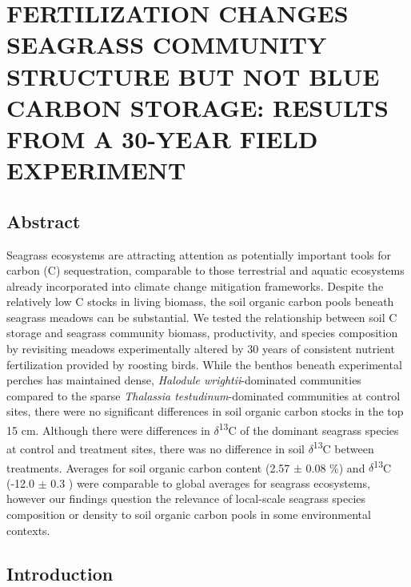 \chapter{FERTILIZATION CHANGES SEAGRASS COMMUNITY STRUCTURE BUT NOT BLUE CARBON STORAGE: RESULTS FROM A 30-YEAR FIELD EXPERIMENT}		\label{another chapter}

\section{Abstract}


Seagrass ecosystems are attracting attention as potentially important tools for carbon (C) sequestration, comparable to those terrestrial and aquatic ecosystems already incorporated into climate change mitigation frameworks. Despite the relatively low C stocks in living biomass, the soil organic carbon pools beneath seagrass meadows can be substantial. We tested the relationship between soil C storage and seagrass community biomass, productivity, and species composition by revisiting meadows experimentally altered by 30 years of consistent nutrient fertilization provided by roosting birds. While the benthos beneath experimental perches has maintained dense, \textit{Halodule wrightii}-dominated communities compared to the sparse \textit{Thalassia testudinum}-dominated communities at control sites, there were no significant differences in soil organic carbon stocks in the top 15 cm. Although there were differences in $\delta$\textsuperscript{13}C of the dominant seagrass species at control and treatment sites, there was no difference in soil $\delta$\textsuperscript{13}C between treatments. Averages for soil organic carbon content (2.57 $\pm$ 0.08 \%) and $\delta$\textsuperscript{13}C (-12.0 $\pm$ 0.3 \textperthousand) were comparable to global averages for seagrass ecosystems, however our findings question the relevance of local-scale seagrass species composition or density to soil organic carbon pools in some environmental contexts.


\section{Introduction}

